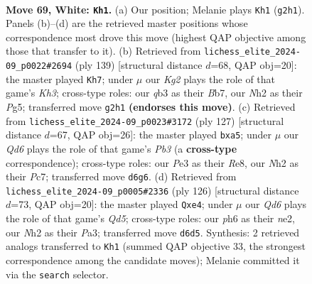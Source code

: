 \documentclass[11pt]{article}
\begin{document}
\clearpage

\begin{figure}[p]\centering
\begin{subfigure}{0.46\textwidth}\centering
\resizebox{\linewidth}{!}{%
\newchessgame
\chessboard[
  setfen={5rr1/p5p1/3Q3p/k2p3P/p2P2P1/1q2P3/6KN/4b3 w - - 46 69},
  showmover=false,
  pgfstyle=straightmove, color=movearrow, markmove={g2-h1}
]}
\caption{}
\end{subfigure}\hfill
\begin{subfigure}{0.46\textwidth}\centering
\resizebox{\linewidth}{!}{%
\newchessgame
\chessboard[
  setfen={8/1b4p1/4p2k/1pP1P1pP/1P3qP1/6RK/8/4Q3 b - - 7 70},
  showmover=false,
  pgfstyle=straightmove, color=movearrow, markmove={h6-h7}
]}
\caption{}
\end{subfigure}
\\[4pt]
\begin{subfigure}{0.46\textwidth}\centering
\resizebox{\linewidth}{!}{%
\newchessgame
\chessboard[
  setfen={4r1k1/2p5/1p1p2P1/PP6/7p/P1q4P/2B2RP1/5R1K b - - 0 64},
  showmover=false,
  pgfstyle=straightmove, color=movearrow, markmove={b6-a5}
]}
\caption{}
\end{subfigure}\hfill
\begin{subfigure}{0.46\textwidth}\centering
\resizebox{\linewidth}{!}{%
\newchessgame
\chessboard[
  setfen={4rb1k/1p4pp/p7/3Q1PP1/1P2r3/P4K2/4n3/8 w - - 3 64},
  showmover=false,
  pgfstyle=straightmove, color=movearrow, markmove={d5-e4}
]}
\caption{}
\end{subfigure}
\caption{\textbf{Move 69, White: \texttt{Kh1}.} (a) Our position; Melanie plays \texttt{Kh1} (\texttt{g2h1}). Panels (b)--(d) are the retrieved master positions whose correspondence most drove this move (highest QAP objective among those that transfer to it). (b) Retrieved from \texttt{lichess\_elite\_2024-09\_p0022\#2694} (ply 139) [structural distance $d$=68, QAP obj=20]: the master played \texttt{Kh7}; under $\mu$ our \emph{Kg2} plays the role of that game's \emph{Kh3}; cross-type roles: our \emph{q}b3 as their \emph{B}b7, our \emph{N}h2 as their \emph{P}g5; transferred move \texttt{g2h1} \textbf{(endorses this move)}. (c) Retrieved from \texttt{lichess\_elite\_2024-09\_p0023\#3172} (ply 127) [structural distance $d$=67, QAP obj=26]: the master played \texttt{bxa5}; under $\mu$ our \emph{Qd6} plays the role of that game's \emph{Pb3} (a \textbf{cross-type} correspondence); cross-type roles: our \emph{P}e3 as their \emph{R}e8, our \emph{N}h2 as their \emph{P}c7; transferred move \texttt{d6g6}. (d) Retrieved from \texttt{lichess\_elite\_2024-09\_p0005\#2336} (ply 126) [structural distance $d$=73, QAP obj=20]: the master played \texttt{Qxe4}; under $\mu$ our \emph{Qd6} plays the role of that game's \emph{Qd5}; cross-type roles: our \emph{p}h6 as their \emph{n}e2, our \emph{N}h2 as their \emph{P}a3; transferred move \texttt{d6d5}. Synthesis: 2 retrieved analogs transferred to \texttt{Kh1} (summed QAP objective 33, the strongest correspondence among the candidate moves); Melanie committed it via the \texttt{search} selector.}
\label{fig:thought-m136}
\end{figure}
\end{document}
